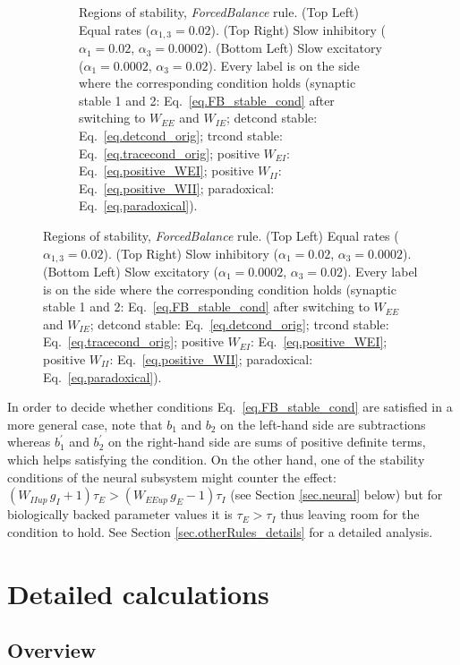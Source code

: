 \documentclass[twocolumn]{article}
\newcommand{\EE}{\mathit{EE}}
\newcommand{\EI}{\mathit{EI}}
\newcommand{\IE}{\mathit{IE}}
\newcommand{\II}{\mathit{II}}
\newcommand{\up}{\mathit{up}}
\begin{document}
\begin{figure}[!ht]
{\begin{figure}[H]
\caption{Regions of stability, {\em ForcedBalance} rule. (Top Left) Equal rates ($\alpha_{1,3}=0.02$). (Top Right) Slow inhibitory ($\alpha_1=0.02$, $\alpha_3=0.0002$). (Bottom Left) Slow excitatory ($\alpha_1=0.0002$, $\alpha_3=0.02$). Every label is on the side where the  corresponding  condition  holds (synaptic stable 1 and 2: Eq.\ \ref{eq.FB_stable_cond} after switching to $W_{\EE}$ and $W_{\IE}$; detcond stable: Eq.\ \ref{eq.detcond_orig}; trcond stable: Eq.\ \ref{eq.tracecond_orig}; positive $W_{\EI}$: Eq.\ \ref{eq.positive_WEI}; positive $W_{\II}$: Eq.\ \ref{eq.positive_WII}; paradoxical: Eq.\ \ref{eq.paradoxical}).}
\label{fig.FB_stability}
\end{figure}}
\end{figure}




In order to decide whether conditions Eq.\ \ref{eq.FB_stable_cond} are satisfied in a more general case, note that $b_1$ and $b_2$ on the left-hand side are subtractions whereas $b_1^\prime$ and $b_2^\prime$ on the right-hand side are sums of positive definite terms, which helps satisfying the condition. On the other hand, one of the stability conditions of the neural subsystem might counter the effect: $(W_{\II\up} \, g_I + 1)\tau_E > (W_{\EE\up} \, g_E - 1)\tau_I$ (see Section \ref{sec.neural} below) but for biologically backed parameter values it is $\tau_E > \tau_I$ thus leaving room for the condition to hold. See Section \ref{sec.otherRules_details} for a detailed analysis.




\section{Detailed calculations}
\label{sec.Details}

\subsection{Overview}
\end{document}
